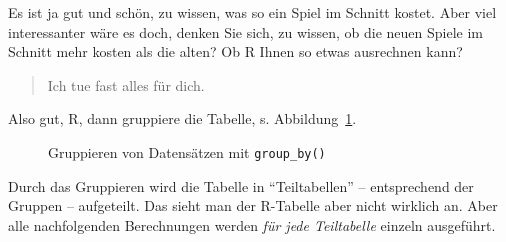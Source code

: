 \documentclass[
  letterpaper,
]{scrbook}
\theoremstyle{definition}
\theoremstyle{definition}
\theoremstyle{definition}
\theoremstyle{remark}
\begin{document}
Es ist ja gut und schön, zu wissen, was so ein Spiel im Schnitt kostet.
Aber viel interessanter wäre es doch, denken Sie sich, zu wissen, ob die
neuen Spiele im Schnitt mehr kosten als die alten? Ob R Ihnen so etwas
ausrechnen kann?

\begin{quote}
{} Ich tue fast alles für dich. {}
\end{quote}

Also gut, R, dann gruppiere die Tabelle, s. Abbildung~\ref{fig-group}.

\begin{figure}


\caption{\label{fig-group}Gruppieren von Datensätzen mit
\texttt{group\_by()}}

\end{figure}%

Durch das Gruppieren wird die Tabelle in ``Teiltabellen'' --
entsprechend der Gruppen -- aufgeteilt. Das sieht man der R-Tabelle aber
nicht wirklich an. Aber alle nachfolgenden Berechnungen werden \emph{für
jede Teiltabelle} einzeln ausgeführt.
\end{document}
